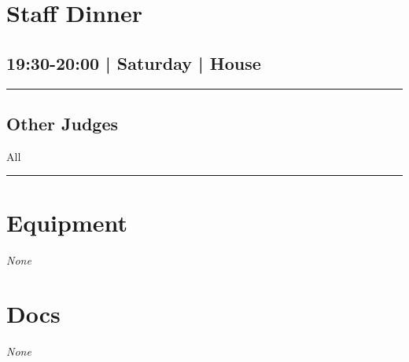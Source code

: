 \documentclass[10pt, A5]{article}
\begin{document}
        \begin{framed}
        \begin{minipage}{\textwidth}

        \setcounter{section}{39}
        \section{Staff Dinner}
        \subsection*{19:30-20:00 | Saturday | House}

        \vspace{0.25cm}
        \hrule
        \vspace{0.25cm}


        \subsection*{Other Judges}
                    All

            \vspace{0.25cm}
        \hrule
        \vspace{0.25cm}

        \begin{multicols}{2}

		\section*{\faWrench \: Equipment}

				\textit{None}
		
		\vfill\null
		\columnbreak

			\section*{\faFile \: Docs}
		 	\textit{None}
	

		\vfill\null

		\end{multicols}
\end{minipage}
\end{framed}
\end{document}
